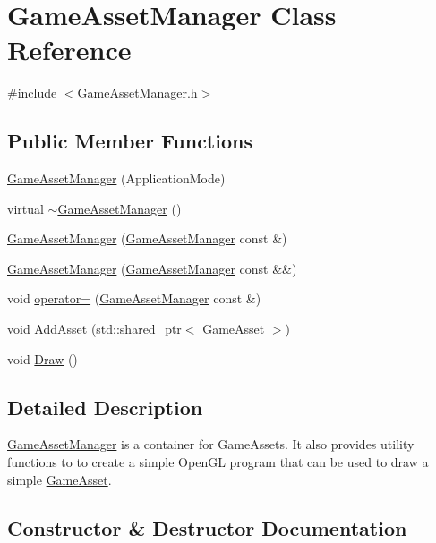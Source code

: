 \hypertarget{classGameAssetManager}{}\section{Game\+Asset\+Manager Class Reference}
\label{classGameAssetManager}


{\ttfamily \#include $<$Game\+Asset\+Manager.\+h$>$}

\subsection*{Public Member Functions}
\begin{DoxyCompactItemize}
\item 
\hyperlink{classGameAssetManager_aaa0d58e276cc10ad91a7457085598a71}{Game\+Asset\+Manager} (Application\+Mode)
\item 
virtual \hyperlink{classGameAssetManager_a1270bd61ecbcca563f079803e40c9b77}{$\sim$\+Game\+Asset\+Manager} ()
\item 
\hyperlink{classGameAssetManager_a2c9adcb72faa154c87eadc9bafe5269d}{Game\+Asset\+Manager} (\hyperlink{classGameAssetManager}{Game\+Asset\+Manager} const \&)
\item 
\hyperlink{classGameAssetManager_a44f6e2fd6b8ff1dd64e5697f1be7386d}{Game\+Asset\+Manager} (\hyperlink{classGameAssetManager}{Game\+Asset\+Manager} const \&\&)
\item 
void \hyperlink{classGameAssetManager_ac72678a4ad5378c685aa6bae84a4e712}{operator=} (\hyperlink{classGameAssetManager}{Game\+Asset\+Manager} const \&)
\item 
void \hyperlink{classGameAssetManager_ad3de8ff00d55ba04728b1de8213b2349}{Add\+Asset} (std\+::shared\+\_\+ptr$<$ \hyperlink{classGameAsset}{Game\+Asset} $>$)
\item 
void \hyperlink{classGameAssetManager_a32837132bd70a9a9ed537323c2d3d886}{Draw} ()
\end{DoxyCompactItemize}


\subsection{Detailed Description}
\hyperlink{classGameAssetManager}{Game\+Asset\+Manager} is a container for Game\+Assets. It also provides utility functions to to create a simple Open\+G\+L program that can be used to draw a simple \hyperlink{classGameAsset}{Game\+Asset}. 

\subsection{Constructor \& Destructor Documentation}
\hypertarget{classGameAssetManager_aaa0d58e276cc10ad91a7457085598a71}{}
